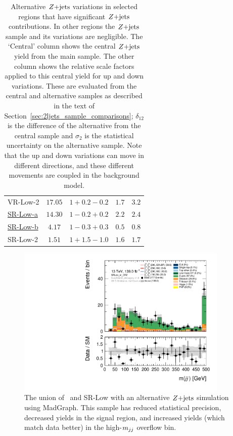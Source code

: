 \begin{table}[tp]
\begin{tabular}{lcccc}
\\[0.2em]
VR-Low-2
& $17.05$
& $1+0.2-0.2$
& $1.7$
& $3.2$
\\[0.5em]
\underline{SR-Low-a}
& $14.30$
& $1-0.2+0.2$
& $2.2$
& $2.4$
\\[0.2em]
\underline{SR-Low-b}
& $4.17$
& $1-0.3+0.3$
& $0.5$
& $0.8$
\\[0.2em]
SR-Low-2
& $1.51$
& $1+1.5-1.0$
& $1.6$
& $1.7$
\\[0.2em]
\end{tabular}
\caption[%
Alternative $\zjets$ variations in selected regions
]{%
Alternative $\zjets$ variations in selected regions that have significant
$\zjets$ contributions.
In other regions the $\zjets$ sample and its variations are negligible.
The `Central' column shows the central $\zjets$ yield from the main sample.
The other column shows the relative scale factors applied to this central yield
for up and down variations.
These are evaluated from the central and alternative samples as described in
the text of Section~\ref{sec:2ljets_sample_comparisons};
$\delta_{12}$ is the difference of the alternative from the central sample
and $\sigma_2$ is the statistical uncertainty on the alternative sample.
Note that the up and down variations can move in different directions, and
these different movements are coupled in the background model.
}
\label{tab:2ljets_zjets_alt}
\end{table}

\begin{figure}[tp]
\centering
\includegraphics[width=0.9\textwidth]{figures/2ljets_low_mjj_SRLow_or_CRZ_mg5.pdf}
\caption[
The union of CR-Z and SR-Low with an alternative $\zjets$ simulation using
MadGraph
]{%
The union of \crz\ and SR-Low with an alternative $\zjets$ simulation using
MadGraph.
This sample has reduced statistical precision, decreased yields in the signal
region, and increased yields (which match data better) in the high-$m_{jj}$
overflow bin.
}
\label{fig:2ljets_low_sr_or_cr_region_alt}
\end{figure}

